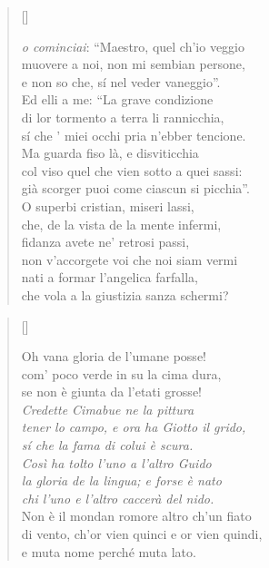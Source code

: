 \documentclass{article}
\begin{document}
\begin{verse}[\versewidth]
  \begin{patverse*}
    \emph{o cominciai}: ``Maestro, quel ch'io veggio\\
    muovere a noi, non mi sembian persone,\\
    e non so che, sí nel veder vaneggio''.\\
    Ed elli a me: ``La grave condizione\\
    di lor tormento a terra li rannicchia,\\
    sí che ' miei occhi pria n'ebber tencione.\\
    Ma guarda fiso là, e disviticchia\\
    col viso quel che vien sotto a quei sassi:\\
    già scorger puoi come ciascun si picchia''.\\
    O superbi cristian, miseri lassi,\\
    che, de la vista de la mente infermi,\\
    fidanza avete ne' retrosi passi,\\
    non v'accorgete voi che noi siam vermi\\
    nati a formar l'angelica farfalla,\\
    che vola a la giustizia sanza schermi?
    \end{patverse*}
\end{verse}

\begin{verse}[\versewidth]
  \begin{patverse*}
    Oh vana gloria de l'umane posse!\\
    com' poco verde in su la cima dura,\\
    se non è giunta da l'etati grosse!\\
    \emph{Credette Cimabue ne la pittura\\
    tener lo campo, e ora ha Giotto il grido,\\
    sí che la fama di colui è scura.\\
    Così ha tolto l'uno a l'altro Guido\\
    la gloria de la lingua; e forse è nato\\
    chi l'uno e l'altro caccerà del nido.}\\
    Non è il mondan romore altro ch'un fiato\\
    di vento, ch'or vien quinci e or vien quindi,\\
    e muta nome perché muta lato.
  \end{patverse*}
\end{verse}
\end{document}
